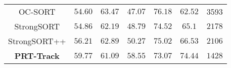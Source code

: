 \begin{table*}[!htbp]
\begin{center}
\begin{tabular}{ |c|c|c|c|c|c|c| }
			OC-SORT  &  $54.60$ & \textbf{$63.47$} & $47.07$ & \textbf{$76.18$} & $62.52$  & 3593\\ 
			
			StrongSORT  &  $54.86$ & $62.19$ & $48.79$ & $74.52$ & $65.1$ & $2178$\\ 
			
			StrongSORT++ & $56.21$ & $62.89$ & $50.27$ & $75.02$ & $66.53$ & $2106$\\ 
			
			\textbf{PRT-Track} &  \textbf{$59.77$} & $61.09$ & \textbf{$58.55$} & $73.07$ & \textbf{$74.44$} & \textbf{$1428$} \\ 
			\hline
			
		\end{tabular}
		\label{4_tracking_results}
	\end{center}
\end{table*}
